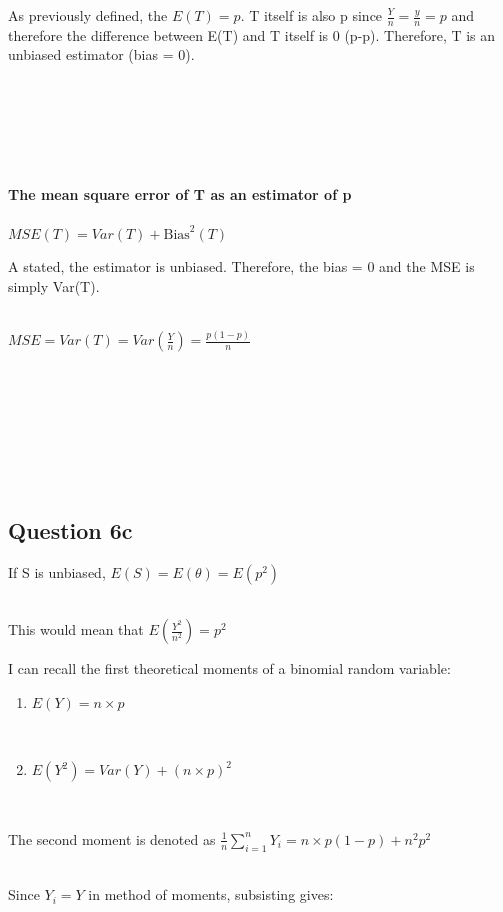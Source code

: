 \documentclass[
]{article}
\providecommand{\tightlist}{%
  \setlength{\itemsep}{0pt}\setlength{\parskip}{0pt}}
\begin{document}
As previously defined, the \(E(T) = p\). T itself is also p since
\(\frac{Y}{n} = \frac{y}{n} = p\) and therefore the difference between
E(T) and T itself is 0 (p-p). Therefore, T is an unbiased estimator
(bias = 0).\\
\strut \\
\strut \\
\strut \\

\paragraph{The mean square error of T as an estimator of
p}\label{the-mean-square-error-of-t-as-an-estimator-of-p}

\(MSE(T) = Var(T)+\text{Bias}^2(T)\)

A stated, the estimator is unbiased. Therefore, the bias = 0 and the MSE
is simply Var(T).\\
\strut \\
\(MSE = Var(T) = Var(\frac{Y}{n}) = \frac{p(1-p)}{n}\)\\
\strut \\
\strut \\
\strut \\
\strut \\

\subsection{Question 6c}\label{question-6c}

\hfill\break
If S is unbiased, \(E(S) = E(θ) = E(p^2)\)\\
\strut \\
This would mean that \(E(\frac{Y^2}{n^2}) = p^2\)

I can recall the first theoretical moments of a binomial random
variable:

\begin{enumerate}
\def\labelenumi{\arabic{enumi}.}
\tightlist
\item
  \(E(Y) = n\times p\)\\
  \strut \\
\item
  \(E(Y^2)= Var(Y) + (n\times p) ^2\)\\
  \strut \\
\end{enumerate}

The second moment is denoted as
\(\frac{1}{n}\sum_{i = 1}^nY_i = n\times p(1-p) + n^2p^2\)\\
\strut \\
Since \(Y_i = Y\) in method of moments, subsisting gives:\\
\strut \\
\end{document}
